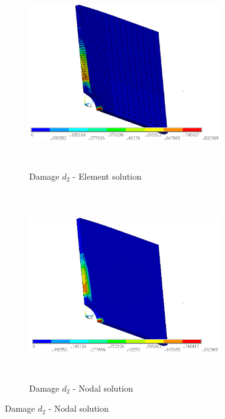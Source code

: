 \documentclass[12pt]{report}
\begin{document}
\begin{figure}[htbp!]\ContinuedFloat     
     \begin{subfigure}[b]{0.4\textwidth}
        \includegraphics[width=8.3cm,height=8.2cm,keepaspectratio]{27.d2-lt-e.png}
         \caption{Damage $d_{2}$ - Element solution}
         \label{fig:d2-lt-e}
     \end{subfigure}
    \hspace{1.8cm}
      \begin{subfigure}[b]{0.4\textwidth}
         \includegraphics[width=8.3cm,height=8.2cm,keepaspectratio]{27.d2-lt-n.png}
         \caption{Damage $d_{2}$ - Nodal solution}
         \label{fig:d2-lt-n}
     \end{subfigure}
\end{figure}
\FloatBarrier
\end{document}
